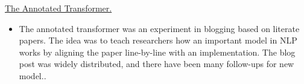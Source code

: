 \documentclass[10pt]{article}
\begin{document}
\ind \href{ paper.link } { The Annotated Transformer. }
\begin{itemize}
\item The annotated transformer was an experiment in blogging based on literate papers. The idea was to teach researchers how an important model in NLP works by aligning the paper line-by-line with an implementation. The blog post was widely distributed, and there have been many follow-ups for new model..
\end{itemize}
\medskip














% 
% 
% 
\end{document}
